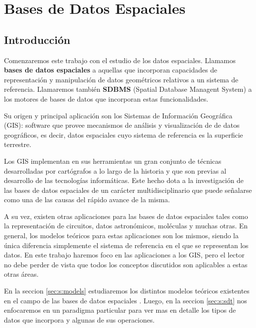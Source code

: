 \newcommand{\concept}{\textbf}

\chapter{Bases de Datos Espaciales}  \label{cap:e}

\section{Introducción}

Comenzaremos este trabajo con el estudio de los datos espaciales. Llamamos \concept{bases de datos espaciales} a aquellas que incorporan capacidades de representación y manipulación de datos geométricos relativos a un sistema de referencia. Llamaremos también \concept{SDBMS} (Spatial Database Managent System) a los motores de bases de datos que incorporan estas funcionalidades.

Su origen y principal aplicación son los Sistemas de Información Geográfica (GIS): software que provee mecanismos de análisis y visualización de de datos geográficos, es decir, datos espaciales cuyo sistema de referencia  es la superficie terrestre.

Los GIS implementan en sus herramientas un gran conjunto de técnicas desarrolladas por cartógrafos a lo largo de la historia y que son previas al desarrollo de las tecnologías informáticas. Este hecho dota a la investigación de las bases de datos espaciales de un carácter multidisciplinario que puede señalarse como una de las causas del rápido avance de la misma.

A su vez, existen otras aplicaciones para las bases de datos espaciales tales como la representación de circuitos, datos astronómicos, moléculas y muchas otras.
En general, los modelos teóricos para estas aplicaciones son los mismos, siendo la única diferencia simplemente el sistema de referencia en el que se representan los datos.
En este trabajo haremos foco en las aplicaciones a los GIS, pero el lector no debe perder de vista que todos los conceptos discutidos son aplicables a estas otras áreas.

En la seccion \ref{sec:s:models} estudiaremos los distintos modelos teóricos existentes en el campo de las bases de datos espaciales . Luego, en la seccion \ref{sec:s:sdt} nos enfocaremos en un paradigma particular para ver mas en detalle los tipos de datos que incorpora y algunas de sus operaciones.

